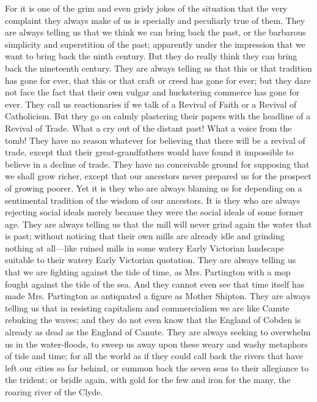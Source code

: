 \documentclass{book}
\begin{document}
For it is one of the grim and even grisly jokes of the situation that the very complaint they always make of us is specially and peculiarly true of them. They are always telling us that we think we can bring back the past, or the barbarous simplicity and superstition of the past; apparently under the impression that we want to bring back the ninth century. But they do really think they can bring back the nineteenth century. They are always telling us that this or that tradition has gone for ever, that this or that craft or creed has gone for ever; but they dare not face the fact that their own vulgar and huckstering commerce has gone for ever. They call us reactionaries if we talk of a Revival of Faith or a Revival of Catholicism. But they go on calmly plastering their papers with the headline of a Revival of Trade. What a cry out of the distant past! What a voice from the tomb! They have no reason whatever for believing that there will be a revival of trade, except that their great-grandfathers would have found it impossible to believe in a decline of trade. They have no conceivable ground for supposing that we shall grow richer, except that our ancestors never prepared us for the prospect of growing poorer. Yet it is they who are always blaming us for depending on a sentimental tradition of the wisdom of our ancestors. It is they who are always rejecting social ideals merely because they were the social ideals of some former age. They are always telling us that the mill will never grind again the water that is past; without noticing that their own mills are already idle and grinding nothing at all—like ruined mills in some watery Early Victorian landscape suitable to their watery Early Victorian quotation. They are always telling us that we are fighting against the tide of time, as Mrs. Partington with a mop fought against the tide of the sea. And they cannot even see that time itself has made Mrs. Partington as antiquated a figure as Mother Shipton. They are always telling us that in resisting capitalism and commercialism we are like Canute rebuking the waves; and they do not even know that the England of Cobden is already as dead as the England of Canute. They are always seeking to overwhelm us in the water-floods, to sweep us away upon these weary and washy metaphors of tide and time; for all the world as if they could call back the rivers that have left our cities so far behind, or summon back the seven seas to their allegiance to the trident; or bridle again, with gold for the few and iron for the many, the roaring river of the Clyde.
\end{document}
